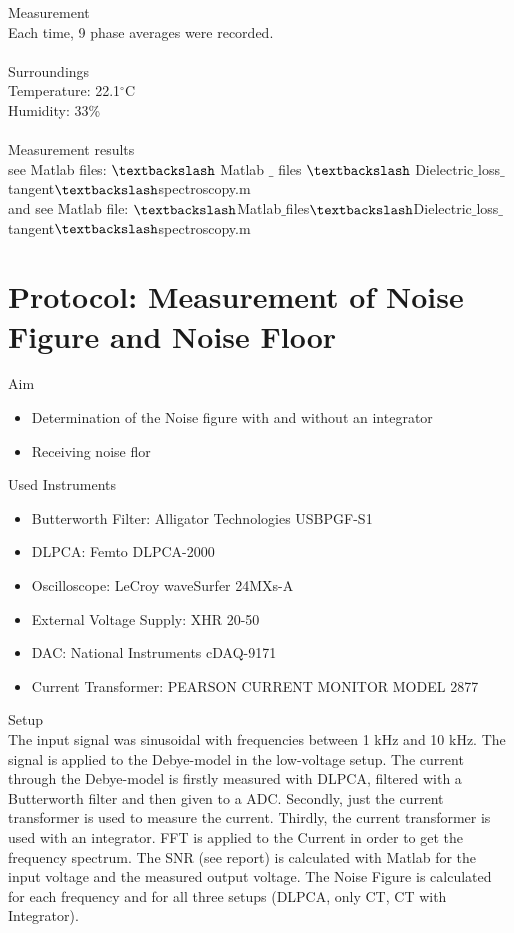 {\Large Measurement} \\
Each time, 9 phase averages were recorded.\\ 
\\
{\Large  Surroundings} \\
Temperature: 22.1$^{\circ}$C\\
Humidity: 33\%\\
\\
{\Large Measurement results}\\
see Matlab files: $\textbackslash$ Matlab $\_$ files $\textbackslash$ Dielectric$\_$loss$\_$tangent$\textbackslash$spectroscopy.m\\
and see Matlab file: $\textbackslash$Matlab$\_$files$\textbackslash$Dielectric$\_$loss$\_$tangent$\textbackslash$spectroscopy.m


\section{Protocol: Measurement of Noise Figure and Noise Floor}
{\Large Aim}
\begin{itemize}
\item Determination of the Noise figure with and without an integrator 
\item Receiving noise flor 
\end{itemize}
{\Large Used Instruments}
\begin{itemize}
 \item Butterworth Filter: Alligator Technologies USBPGF-S1
 \item DLPCA: Femto DLPCA-2000
 \item Oscilloscope: LeCroy waveSurfer 24MXs-A
 \item External Voltage Supply:  XHR 20-50
 \item DAC: National Instruments cDAQ-9171
 \item Current Transformer: PEARSON CURRENT
MONITOR MODEL 2877
\end{itemize}
{\Large Setup} \\
The input signal was  sinusoidal with frequencies between 1 kHz and 10 kHz. The signal is applied to the Debye-model in the low-voltage setup. The current through the Debye-model is firstly measured with DLPCA, filtered with a Butterworth filter and then given to a ADC. Secondly, just the current transformer is used to measure the current. Thirdly, the current transformer is used with an integrator.  FFT is applied to the Current in order to get the frequency spectrum. The SNR (see report) is calculated with Matlab for the input voltage and the measured output voltage. The Noise Figure is calculated for each frequency and for all three setups (DLPCA, only CT, CT with Integrator).\\
